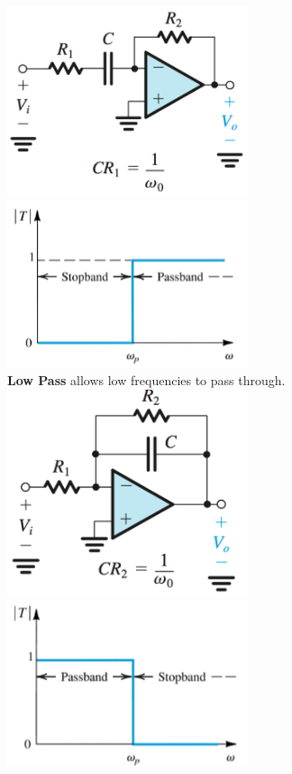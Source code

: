 \documentclass[11pt]{article}
\begin{document}
    \includegraphics[width=200pt]{highpass} \includegraphics[width=200pt]{highpass2}
    \\
    
    \textbf{Low Pass} allows low frequencies to pass through. \\

    \includegraphics[width=200pt]{lowpass} \includegraphics[width=200pt]{lowpass2} 
    
    \pagebreak
     
\end{document}
